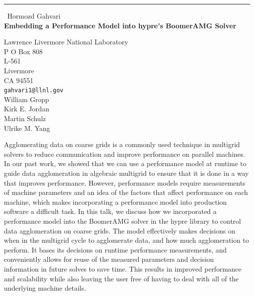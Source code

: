 \documentclass{report}
\begin{document}
\begin{center}
\rule{6in}{1pt} \
{\large Hormozd Gahvari \\
{\bf Embedding a Performance Model into hypre's BoomerAMG Solver}}

Lawrence Livermore National Laboratory \\ P O Box 808 \\ L-561 \\ Livermore \\ CA 94551
\\
{\tt gahvari1@llnl.gov}\\
William Gropp\\
Kirk E. Jordan\\
Martin Schulz\\
Ulrike M. Yang\end{center}

Agglomerating data on coarse grids is a commonly used technique in
multigrid solvers to reduce communication and improve performance on
parallel machines. In our past work, we showed that we can use a
performance model at runtime to guide data agglomeration in algebraic
multigrid to ensure that it is done in a way that improves performance.
However, performance models require measurements of machine parameters
and an idea of the factors that affect performance on each machine, which
makes incorporating a performance model into production software a
difficult task. In this talk, we discuss how we incorporated a
performance model into the BoomerAMG solver in the hypre library to
control data agglomeration on coarse grids. The model effectively makes
decisions on when in the multigrid cycle to agglomerate data, and how
much agglomeration to perform. It bases its decisions on runtime
performance measurements, and conveniently allows for reuse of the
measured parameters and decision information in future solves to save
time. This results in improved performance and scalability while also
leaving the user free of having to deal with all of the underlying
machine details.
\end{document}
